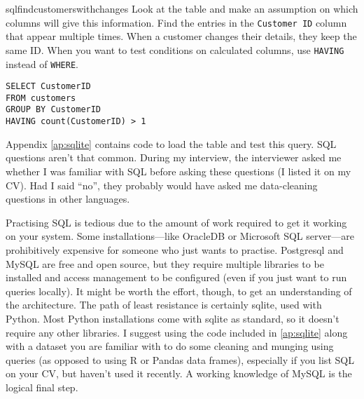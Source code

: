 \begin{answer}{sqlfindcustomerswithchanges}
Look at the table and make an assumption on which columns will give this information.
Find the entries in the \verb+Customer ID+ column that appear multiple times.
When a customer changes their details, they keep the same ID.
When you want to test conditions on calculated columns, use
\verb+HAVING+
instead of
\verb+WHERE+.
\begin{verbatim}
SELECT CustomerID
FROM customers
GROUP BY CustomerID
HAVING count(CustomerID) > 1
\end{verbatim}
Appendix \ref{ap:sqlite} contains code to load the table and test this query.
SQL questions aren't that common.
During my interview, the interviewer asked me whether I was familiar with SQL before asking these questions (I listed it on my CV).
Had I said ``no'', they probably would have asked me data-cleaning questions in other languages.

Practising SQL is tedious due to the amount of work required to get it working on your system.
Some installations---like OracleDB or Microsoft SQL server---are prohibitively expensive for someone who just wants to practise.
Postgresql and MySQL are free and open source, but they require multiple libraries to be installed and access management to be configured (even if you just want to run queries locally).
It might be worth the effort, though, to get an understanding of the architecture.
The path of least resistance is certainly sqlite, used with Python.
Most Python installations come with sqlite as standard, so it doesn't require any other libraries.
I suggest using the code included in \ref{ap:sqlite} along with a dataset you are familiar with to do some cleaning and munging using queries (as opposed to using R or Pandas data frames), especially if you list SQL on your CV, but haven't used it recently.
A working knowledge of MySQL is the logical final step.
\end{answer}
